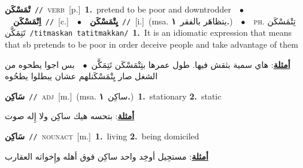 \documentclass[10pt,a4paper,twoside]{article} %
\begin{document}
\begin{multicols}{2}
{\setlength\topsep{0pt}\textbf{\foreignlanguage{arabic}{تْمَسْكَن}}\ {\color{gray}\texttt{//}\color{black}}\ \textsc{verb}\ [p.]\ \textbf{1.}~pretend to be poor and downtrodder\ \ $\bullet$\ \ \setlength\topsep{0pt}\textbf{\foreignlanguage{arabic}{اِتْمَسْكَن}}\ {\color{gray}\texttt{//}\color{black}}\ [c.]\ \ $\bullet$\ \ \setlength\topsep{0pt}\textbf{\foreignlanguage{arabic}{يِتْمَسْكَن}}\ {\color{gray}\texttt{//}\color{black}}\ [i.]\ \color{gray}(msa. \foreignlanguage{arabic}{يتظاهَر بالفقر}~\foreignlanguage{arabic}{\textbf{١.}})\color{black}\ \ $\bullet$\ \ \textsc{ph.} \color{gray} \foreignlanguage{arabic}{تِتْمَسْكَن تَتِمَكَّن}\color{black}\ {\color{gray}\texttt{/{\sffamily titmaskan tatitmakkan}/}\color{black}}\ \textbf{1.}~It is an idiomatic expression that means that sb pretends to be poor in order deceive people and take advantage of them\  \begin{flushright}\color{gray}\foreignlanguage{arabic}{\textbf{\underline{\foreignlanguage{arabic}{أمثلة}}}: هاي سمية بثقش فيها. طول عمرها بتِتْمَسْكَن تَتِمَكَّن\ $\bullet$\ \  بس اجوا يطحوه من الشغل صار يِتْمَسْكَنلهم عشان يبطلوا يطحُوه}\end{flushright}\color{black}} \vspace{2mm}

{\setlength\topsep{0pt}\textbf{\foreignlanguage{arabic}{سَاكِن}}\ {\color{gray}\texttt{//}\color{black}}\ \textsc{adj}\ [m.]\ \color{gray}(msa. \foreignlanguage{arabic}{ساكِن}~\foreignlanguage{arabic}{\textbf{١.}})\color{black}\ \textbf{1.}~stationary  \textbf{2.}~static\  \begin{flushright}\color{gray}\foreignlanguage{arabic}{\textbf{\underline{\foreignlanguage{arabic}{أمثلة}}}: بتحسه هيك ساكِن ولا إِله صوت}\end{flushright}\color{black}} \vspace{2mm}

{\setlength\topsep{0pt}\textbf{\foreignlanguage{arabic}{سَاكِن}}\ {\color{gray}\texttt{//}\color{black}}\ \textsc{noun\textunderscore act}\ [m.]\ \textbf{1.}~living  \textbf{2.}~being domiciled\  \begin{flushright}\color{gray}\foreignlanguage{arabic}{\textbf{\underline{\foreignlanguage{arabic}{أمثلة}}}: مستحِيل أوخِد واحد ساكِن فوق أهله وإِخواته العقارب}\end{flushright}\color{black}} \vspace{2mm}


\end{multicols}
\end{document}
